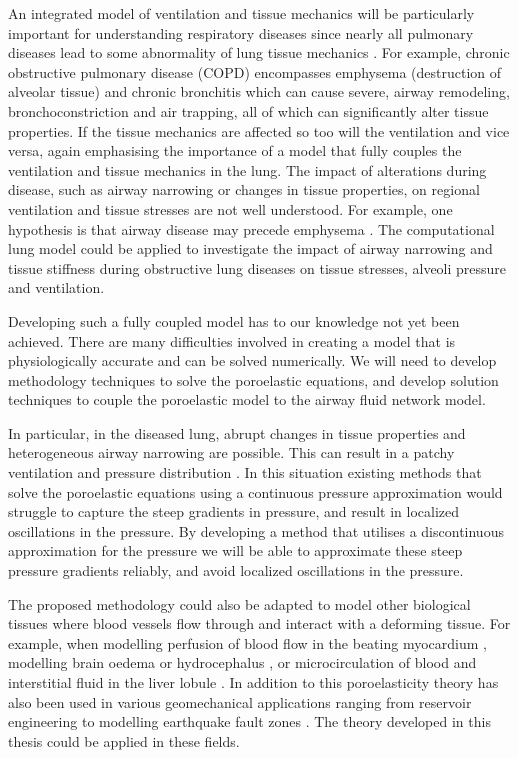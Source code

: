An integrated model of ventilation and tissue mechanics will be particularly important for understanding respiratory diseases since nearly all pulmonary diseases lead to some abnormality of lung tissue mechanics \citep{suki2011lung}. For example, chronic obstructive pulmonary disease (COPD) encompasses emphysema (destruction of alveolar tissue) and chronic bronchitis which can cause severe, airway remodeling, bronchoconstriction and air trapping, all of which can significantly alter tissue properties. If the tissue mechanics are affected so too will the ventilation and vice versa, again emphasising the importance of a model that fully couples the ventilation and tissue mechanics in the lung. The impact of alterations during disease, such as airway narrowing or changes in tissue properties, on regional ventilation and tissue stresses are not well understood. For example, one hypothesis is that airway disease may precede emphysema \citep{galban2012computed}. The computational lung model could be applied to investigate the impact of airway narrowing and tissue stiffness during obstructive lung diseases on tissue stresses, alveoli pressure and ventilation.

Developing such a fully coupled model has to our knowledge not yet been achieved. There are many difficulties involved in creating a model that is physiologically accurate and can be solved numerically. We will need to develop methodology techniques to solve the poroelastic equations, and develop solution techniques to couple the poroelastic model to the airway fluid network model.

In particular, in the diseased lung, abrupt changes in tissue properties and heterogeneous airway narrowing are possible. This can result in a patchy ventilation and pressure distribution \citep{venegas2005self}. In this situation existing methods that solve the poroelastic equations using a continuous pressure approximation would struggle to capture the steep gradients in pressure, and result in localized oscillations in the pressure. By developing a method that utilises a discontinuous approximation for the pressure we will be able to approximate these steep pressure gradients reliably, and avoid localized oscillations in the pressure.%

The proposed methodology could also be adapted to model other biological tissues where blood vessels flow through and interact with a deforming tissue. For example, when modelling perfusion of blood flow in the beating myocardium \citep{chapelle2010poroelastic,cookson2011novel}, modelling brain oedema \citep{li2010three} or hydrocephalus \citep{wirth2006axisymmetric}, or microcirculation of blood and interstitial fluid in the liver lobule \citep{leungchavaphongse2013mathematical}. In addition to this poroelasticity theory has also been used in various geomechanical applications ranging from reservoir engineering \citep{phillips2007coupling} to modelling earthquake fault zones \citep{white2008stabilized}. The theory developed in this thesis could be applied in these fields.


